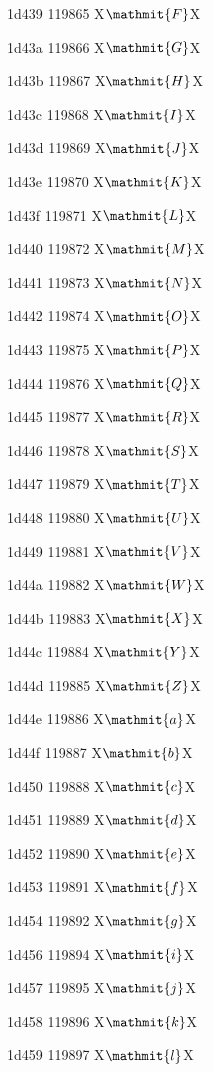 \documentclass[11pt]{article}
\begin{document}
1d439 119865 X{\ensuremath{\mathmit{F}}}X

1d43a 119866 X{\ensuremath{\mathmit{G}}}X

1d43b 119867 X{\ensuremath{\mathmit{H}}}X

1d43c 119868 X{\ensuremath{\mathmit{I}}}X

1d43d 119869 X{\ensuremath{\mathmit{J}}}X

1d43e 119870 X{\ensuremath{\mathmit{K}}}X

1d43f 119871 X{\ensuremath{\mathmit{L}}}X

1d440 119872 X{\ensuremath{\mathmit{M}}}X

1d441 119873 X{\ensuremath{\mathmit{N}}}X

1d442 119874 X{\ensuremath{\mathmit{O}}}X

1d443 119875 X{\ensuremath{\mathmit{P}}}X

1d444 119876 X{\ensuremath{\mathmit{Q}}}X

1d445 119877 X{\ensuremath{\mathmit{R}}}X

1d446 119878 X{\ensuremath{\mathmit{S}}}X

1d447 119879 X{\ensuremath{\mathmit{T}}}X

1d448 119880 X{\ensuremath{\mathmit{U}}}X

1d449 119881 X{\ensuremath{\mathmit{V}}}X

1d44a 119882 X{\ensuremath{\mathmit{W}}}X

1d44b 119883 X{\ensuremath{\mathmit{X}}}X

1d44c 119884 X{\ensuremath{\mathmit{Y}}}X

1d44d 119885 X{\ensuremath{\mathmit{Z}}}X

1d44e 119886 X{\ensuremath{\mathmit{a}}}X

1d44f 119887 X{\ensuremath{\mathmit{b}}}X

1d450 119888 X{\ensuremath{\mathmit{c}}}X

1d451 119889 X{\ensuremath{\mathmit{d}}}X

1d452 119890 X{\ensuremath{\mathmit{e}}}X

1d453 119891 X{\ensuremath{\mathmit{f}}}X

1d454 119892 X{\ensuremath{\mathmit{g}}}X

1d456 119894 X{\ensuremath{\mathmit{i}}}X

1d457 119895 X{\ensuremath{\mathmit{j}}}X

1d458 119896 X{\ensuremath{\mathmit{k}}}X

1d459 119897 X{\ensuremath{\mathmit{l}}}X
\end{document}
